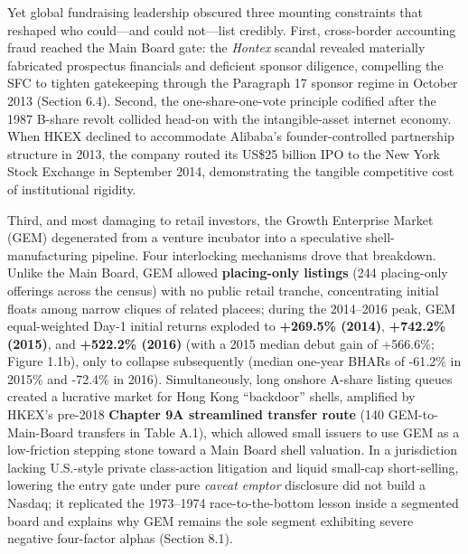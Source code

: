 \documentclass[11pt,letterpaper]{article}
\begin{document}
Yet global fundraising leadership obscured three mounting constraints that reshaped who could—and could not—list credibly. First, cross-border accounting fraud reached the Main Board gate: the \textit{Hontex} scandal revealed materially fabricated prospectus financials and deficient sponsor diligence, compelling the SFC to tighten gatekeeping through the Paragraph 17 sponsor regime in October 2013 (Section 6.4). Second, the one-share-one-vote principle codified after the 1987 B-share revolt collided head-on with the intangible-asset internet economy. When HKEX declined to accommodate Alibaba's founder-controlled partnership structure in 2013, the company routed its US\$25 billion IPO to the New York Stock Exchange in September 2014, demonstrating the tangible competitive cost of institutional rigidity.

Third, and most damaging to retail investors, the Growth Enterprise Market (GEM) degenerated from a venture incubator into a speculative shell-manufacturing pipeline. Four interlocking mechanisms drove that breakdown. Unlike the Main Board, GEM allowed \textbf{placing-only listings} (244 placing-only offerings across the census) with no public retail tranche, concentrating initial floats among narrow cliques of related placees; during the 2014–2016 peak, GEM equal-weighted Day-1 initial returns exploded to \textbf{+269.5\% (2014)}, \textbf{+742.2\% (2015)}, and \textbf{+522.2\% (2016)} (with a 2015 median debut gain of +566.6\%; Figure 1.1b), only to collapse subsequently (median one-year BHARs of -61.2\% in 2015\% and -72.4\% in 2016). Simultaneously, long onshore A-share listing queues created a lucrative market for Hong Kong ``backdoor'' shells, amplified by HKEX's pre-2018 \textbf{Chapter 9A streamlined transfer route} (140 GEM-to-Main-Board transfers in Table A.1), which allowed small issuers to use GEM as a low-friction stepping stone toward a Main Board shell valuation. In a jurisdiction lacking U.S.-style private class-action litigation and liquid small-cap short-selling, lowering the entry gate under pure \textit{caveat emptor} disclosure did not build a Nasdaq; it replicated the 1973–1974 race-to-the-bottom lesson inside a segmented board and explains why GEM remains the sole segment exhibiting severe negative four-factor alphas (Section 8.1).
\end{document}
